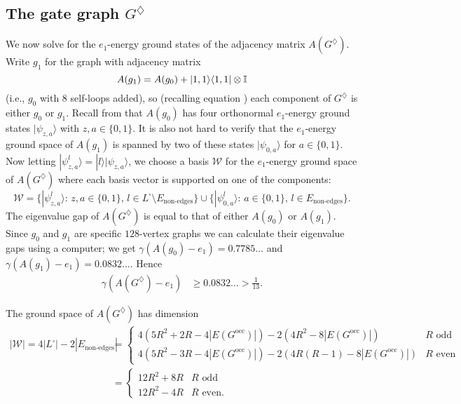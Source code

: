\documentclass[../thesis-main/thesis-main]{subfiles}
\begin{document}
\subsection{The gate graph $G^{\diamondsuit}$}
\label{sec:The-gate-graph_G_DIAMOND}

We now solve for the $e_{1}$-energy ground states of the adjacency matrix $A(G^{\diamondsuit})$. Write $g_{1}$ for the graph with adjacency matrix
\[
A(g_{1})=A(g_{0})+|1,1\rangle\langle1,1|\otimes\mathbb{I}
\]
(i.e., $g_0$ with $8$ self-loops added), so (recalling equation ) each component of $G^{\diamondsuit}$ is either $g_{0}$ or $g_{1}$. Recall from  that $A(g_{0})$ has four orthonormal $e_{1}$-energy ground states $|\psi_{z,a}\rangle$ with $z,a\in\{0,1\}$. It is also not hard to verify that the $e_{1}$-energy ground space of $A(g_{1})$ is spanned by two of these states $|\psi_{0,a}\rangle$ for $a\in\{0,1\}$. Now letting $|\psi_{z,a}^{l}\rangle=|l\rangle|\psi_{z,a}\rangle$, we choose a basis $\mathcal{W}$ for the $e_{1}$-energy ground space of $A(G^{\diamondsuit})$ where each basis vector is supported on one of the components:
\begin{equation}
\mathcal{W}=\big\{ |\psi_{z,a}^{l}\rangle:\, z,a\in\{0,1\},\, l\in L^{\square}\setminus E_{\text{non-edges}}\big\} \cup \big\{ |\psi_{0,a}^{l}\rangle:\, a\in\{0,1\},\, l\in E_{\text{non-edges}}\big\} .\label{eq:definition_of_D}
\end{equation}
The eigenvalue gap of $A(G^{\diamondsuit})$ is equal to that of either $A(g_{0})$ or $A(g_{1})$. Since $g_{0}$ and $g_{1}$ are specific $128$-vertex graphs we can calculate their eigenvalue gaps using a computer; we get $\gamma(A(g_{0})-e_{1})=0.7785\ldots$ and $\gamma(A(g_{1})-e_{1})=0.0832\ldots$. Hence
\begin{align}
\gamma(A(G^{\diamondsuit})-e_{1}) & \geq 0.0832\ldots > \frac{1}{13}.\label{eq:one_thirteenth_bound}
\end{align}

The ground space of $A(G^{\diamondsuit})$ has dimension 
\begin{align}
|\mathcal{W}|=4\big|L^{\square}\big|  -2\left|E_{\text{non-edges}}\right|
&=\begin{cases}
4\left(5R^{2}+2R-4|E(G^{\text{occ}})|\right)-2\left(4R^{2}-8|E(G^{\text{occ}})|\right) & R\text{ odd}\\
4\left(5R^{2}-3R-4|E(G^{\text{occ}})|\right)-2\left(4R(R-1)-8|E(G^{\text{occ}})|\right) & R\text{ even}
\end{cases}\nonumber \\
&= \begin{cases}
12R^{2}+8R & R\text{ odd}\\
12R^{2}-4R & R\text{ even}.
\end{cases}\label{eq:num_basis_D}
\end{align}
\end{document}
